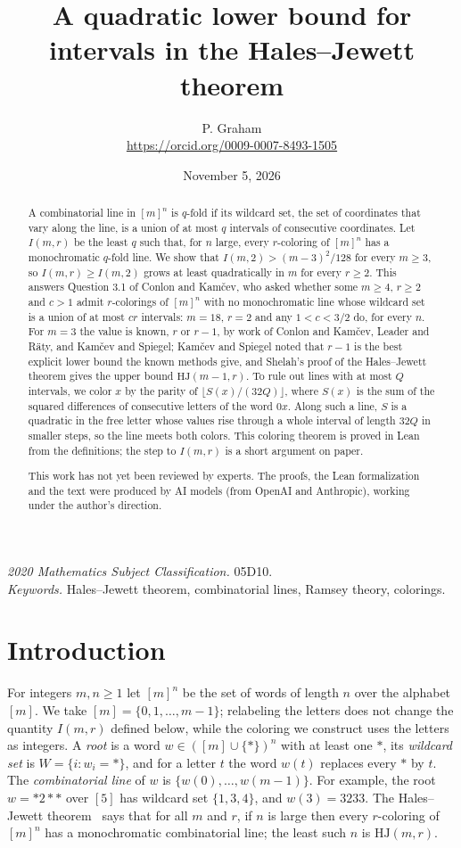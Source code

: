 \documentclass[11pt]{article}
\title{A quadratic lower bound for intervals in the Hales--Jewett theorem}
\author{P. Graham\\ \small\url{https://orcid.org/0009-0007-8493-1505}}
\date{November 5, 2026}
\theoremstyle{remark}
\begin{document}
\maketitle
\begin{abstract}
A combinatorial line in $[m]^n$ is $q$-fold if its wildcard set, the set of coordinates that vary along the line, is a union of at most $q$ intervals of consecutive coordinates. Let $I(m,r)$ be the least $q$ such that, for $n$ large, every $r$-coloring of $[m]^n$ has a monochromatic $q$-fold line. We show that $I(m,2)>(m-3)^2/128$ for every $m\ge3$, so $I(m,r)\ge I(m,2)$ grows at least quadratically in $m$ for every $r\ge2$. This answers Question 3.1 of Conlon and Kamčev, who asked whether some $m\ge4$, $r\ge2$ and $c>1$ admit $r$-colorings of $[m]^n$ with no monochromatic line whose wildcard set is a union of at most $cr$ intervals: $m=18$, $r=2$ and any $1<c<3/2$ do, for every $n$. For $m=3$ the value is known, $r$ or $r-1$, by work of Conlon and Kamčev, Leader and Räty, and Kamčev and Spiegel; Kamčev and Spiegel noted that $r-1$ is the best explicit lower bound the known methods give, and Shelah's proof of the Hales--Jewett theorem gives the upper bound $\mathrm{HJ}(m-1,r)$. To rule out lines with at most $Q$ intervals, we color $x$ by the parity of $\lfloor S(x)/(32Q)\rfloor$, where $S(x)$ is the sum of the squared differences of consecutive letters of the word $0x$. Along such a line, $S$ is a quadratic in the free letter whose values rise through a whole interval of length $32Q$ in smaller steps, so the line meets both colors. This coloring theorem is proved in Lean from the definitions; the step to $I(m,r)$ is a short argument on paper.

This work has not yet been reviewed by experts. The proofs, the Lean formalization and the text were produced by AI models (from OpenAI and Anthropic), working under the author's direction.
\end{abstract}
\medskip
\noindent\textit{2020 Mathematics Subject Classification.} 05D10.\\
\textit{Keywords.} Hales--Jewett theorem, combinatorial lines, Ramsey theory, colorings.

\section{Introduction}

For integers $m,n\ge1$ let $[m]^n$ be the set of words of length $n$ over the alphabet $[m]$. We take $[m]=\{0,1,\ldots,m-1\}$; relabeling the letters does not change the quantity $I(m,r)$ defined below, while the coloring we construct uses the letters as integers. A \emph{root} is a word $w\in([m]\cup\{*\})^n$ with at least one $*$, its \emph{wildcard set} is $W=\{i:w_i=*\}$, and for a letter $t$ the word $w(t)$ replaces every $*$ by $t$. The \emph{combinatorial line} of $w$ is $\{w(0),\ldots,w(m-1)\}$. For example, the root $w={*}2{*}{*}$ over $[5]$ has wildcard set $\{1,3,4\}$, and $w(3)=3233$. The Hales--Jewett theorem~\cite{HJ} says that for all $m$ and $r$, if $n$ is large then every $r$-coloring of $[m]^n$ has a monochromatic combinatorial line; the least such $n$ is $\mathrm{HJ}(m,r)$.
\end{document}
